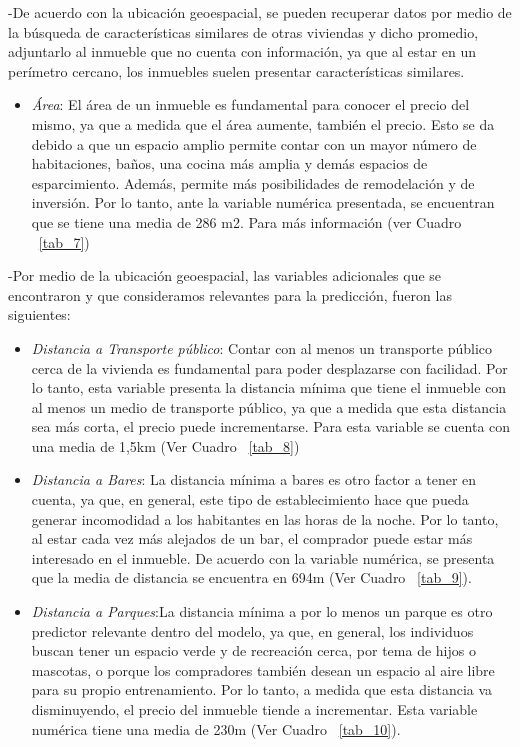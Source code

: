 \documentclass[conference, 10pt]{IEEEtran}
\begin{document}
-De acuerdo con la ubicación geoespacial, se pueden recuperar datos por medio de la búsqueda de características similares de otras viviendas y dicho promedio, adjuntarlo al inmueble que no cuenta con información, ya que al estar en un perímetro cercano, los inmuebles suelen presentar características similares.
\begin{itemize}
\item \textit{Área}: El área de un inmueble es fundamental para conocer el precio del mismo, ya que a medida que el área aumente, también el precio. Esto se da debido a que un espacio amplio permite contar con un mayor número de habitaciones, baños, una cocina más amplia y demás espacios de esparcimiento. Además, permite más posibilidades de remodelación y de inversión. Por lo tanto, ante la variable numérica presentada, se encuentran que se tiene una media de 286 m2. Para más información (ver Cuadro ~\ref{tab_7})

\end{itemize}

-Por medio de la ubicación geoespacial, las variables adicionales que se encontraron y que consideramos relevantes para la predicción, fueron las siguientes: 
\begin{itemize}
\item \textit{Distancia a Transporte público}: Contar con al menos un transporte público cerca de la vivienda es fundamental para poder desplazarse con facilidad. Por lo tanto, esta variable presenta la distancia mínima que tiene el inmueble con al menos un medio de transporte público, ya que a medida que esta distancia sea más corta, el precio puede incrementarse. Para esta variable se cuenta con una media de 1,5km (Ver Cuadro ~\ref{tab_8})
\item \textit{Distancia a Bares}: La distancia mínima a bares es otro factor a tener en cuenta, ya que, en general, este tipo de establecimiento hace que pueda generar incomodidad a los habitantes en las horas de la noche. Por lo tanto, al estar cada vez más alejados de un bar, el comprador puede estar más interesado en el inmueble. De acuerdo con la variable numérica, se presenta que la media de distancia se encuentra en 694m (Ver Cuadro ~\ref{tab_9}).
\item \textit{Distancia a Parques}:La distancia mínima a por lo menos un parque es otro predictor relevante dentro del modelo, ya que, en general, los individuos buscan tener un espacio verde y de recreación cerca, por tema de hijos o mascotas, o porque los compradores también desean un espacio al aire libre para su propio entrenamiento. Por lo tanto, a medida que esta distancia va disminuyendo, el precio del inmueble tiende a incrementar. Esta variable numérica tiene una media de 230m (Ver Cuadro ~\ref{tab_10}). 
\end{itemize}
\end{document}
